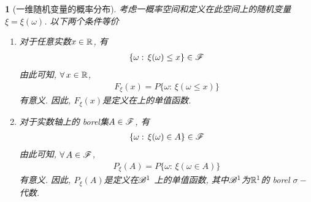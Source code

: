 \newtheorem{one_dim_random_var_distru}[theorem_root]{}
\begin{one_dim_random_var_distru}[一维随机变量的概率分布]
考虑一概率空间\prbsp 和定义在此空间上的随机变量\(\xi = \xi(\omega)\).
以下两个条件等价
\begin{enumerate}
    \item 对于任意实数\(x\in\Rs\), 有
    \begin{align}\{\omega:\,\xi(\omega)\le x\}\in\msF\end{align}
    由此可知, \(\forall\,x\in\Rs\),
    \begin{align}\label{equ:equopc}F_{\xi}(x) = P\{\omega:\,\xi(\omega\le x)\}\end{align}
    有意义. 因此, \(F_{\xi}(x)\)是定义在\Rs 上的单值函数.
    \item 对于实数轴上的 borel集\(A\in\msF\), 有
    \begin{align}\{\omega:\,\xi(\omega)\in A\}\in\msF\end{align}
    由此可知, \(\forall\,A\in\msF\),
    \begin{align}\label{equ:equopb}P_{\xi}(A) = P\{\omega:\,\xi(\omega\in A)\}\end{align}
    有意义. 因此, \(P_{\xi}(A)\)是定义在\(\msB^1\) 上的单值函数, 其中\(\msB^1\)为\(\Rs^1\)的 borel \(\sigma-\)代数.
\end{enumerate}
\end{one_dim_random_var_distru}

